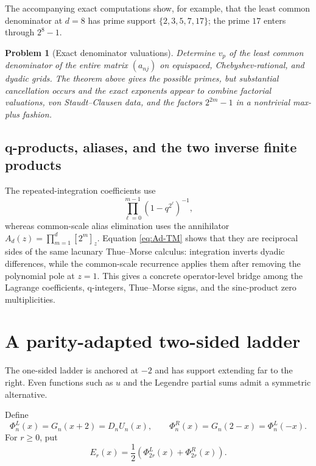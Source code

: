 \documentclass[11pt,oneside]{article}
\newtheorem{problem}[theorem]{Problem}
\theoremstyle{definition}
\theoremstyle{remark}
\begin{document}
The accompanying exact computations show, for example, that the least
common denominator at $d=8$ has prime support
$\{2,3,5,7,17\}$; the prime $17$ enters through $2^8-1$.

\begin{problem}[Exact denominator valuations]
Determine $v_p$ of the least common denominator of the entire matrix
$(a_{nj})$ on equispaced, Chebyshev-rational, and dyadic grids.  The theorem
above gives the possible primes, but substantial cancellation occurs and
the exact exponents appear to combine factorial valuations, von
Staudt--Clausen data, and the factors $2^{2m}-1$ in a nontrivial max-plus
fashion.
\end{problem}

\subsection{q-products, aliases, and the two inverse finite products}
The repeated-integration coefficients use
\begin{equation}
 \prod_{\ell=0}^{m-1}(1-q^{2^\ell})^{-1},
 \label{eq:integration-q-product}
\end{equation}
whereas common-scale alias elimination uses the annihilator
$A_d(z)=\prod_{m=1}^{d}[2^m]_z$.  Equation \eqref{eq:Ad-TM} shows that they
are reciprocal sides of the same lacunary Thue--Morse calculus: integration
inverts dyadic differences, while the common-scale recurrence applies them
after removing the polynomial pole at $z=1$.  This gives a concrete
operator-level bridge among the Lagrange coefficients, q-integers,
Thue--Morse signs, and the sinc-product zero multiplicities.

\section{A parity-adapted two-sided ladder}

The one-sided ladder is anchored at $-2$ and has support extending far to the
right.  Even functions such as $u$ and the Legendre partial sums admit a
symmetric alternative.

Define
\begin{equation}
 \Phi_n^{L}(x)=G_n(x+2)=D_nU_n(x),
 \qquad
 \Phi_n^{R}(x)=G_n(2-x)=\Phi_n^{L}(-x).
 \label{eq:left-right-Phi}
\end{equation}
For $r\ge0$, put
\begin{equation}
 E_r(x)=\frac12\left(\Phi_{2r}^{L}(x)+\Phi_{2r}^{R}(x)\right).
 \label{eq:Er-even}
\end{equation}
\end{document}
